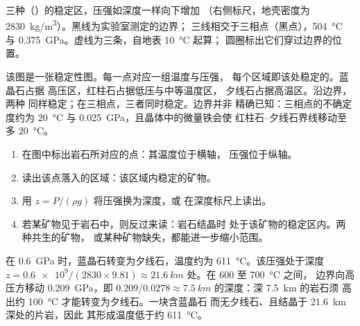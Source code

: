 \begin{omfigure}
{\small 三种（）的稳定区，压强如深度一样向下增加
（右侧标尺，地壳密度为
\qty{2830}{kg/m^3}）。黑线为实验室测定的边界；
三线相交于三相点（黑点），\qty{504}{\celsius} 与
\qty{0.375}{GPa}。虚线为三条，自地表 \qty{10}{\celsius} 起算；
圆圈标出它们穿过边界的位置。}
\end{omfigure}

该图是一张稳定性图。每一点对应一组温度与压强，
每个区域即该处稳定的。蓝晶石占据
高压区，红柱石占据低压与中等温度区，
夕线石占据高温区。沿边界，两种
同样稳定；在三相点，三者同时稳定。边界并非
精确已知：三相点的不确定度约为 \qty{20}{\celsius} 与
\qty{0.025}{GPa}，且晶体中的微量铁会使
红柱石–夕线石界线移动至多 \qty{20}{\celsius}。

\begin{method}\label{met:g12:metamorphic-rocks:pt}
\begin{enumerate}
  \item 在图中标出岩石所对应的点：其温度位于横轴，
        压强位于纵轴。
  \item 读出该点落入的区域：该区域内稳定的矿物。
  \item 用 $z = P/(\rho g)$ 将压强换为深度，或
        在深度标尺上读出。
  \item 若某矿物见于岩石中，则反过来读：岩石结晶时
        处于该矿物的稳定区内。两种共生的矿物，
        或某种矿物缺失，都能进一步缩小范围。
\end{enumerate}
\end{method}

\begin{example}\label{ex:g12:metamorphic-rocks:kysil}
在 \qty{0.6}{GPa} 时，蓝晶石转变为夕线石，温度约为
\qty{611}{\celsius}。该压强处于深度 $z = \num{0.6e9} / (2830
\times 9.81) \approx \qty{21.6}{km}$ 处。在 600 至 \qty{700}{\celsius} 之间，
边界向高压方移动 \qty{0.209}{GPa}，即 $0.209/0.0278 \approx
\qty{7.5}{km}$ 的深度：深 \qty{7.5}{km} 的岩石须
高出约 \qty{100}{\celsius} 才能转变为夕线石。一块含蓝晶石
而无夕线石、且结晶于 \qty{21.6}{km} 深处的片岩，因此
其形成温度低于约 \qty{611}{\celsius}。
\end{example}

